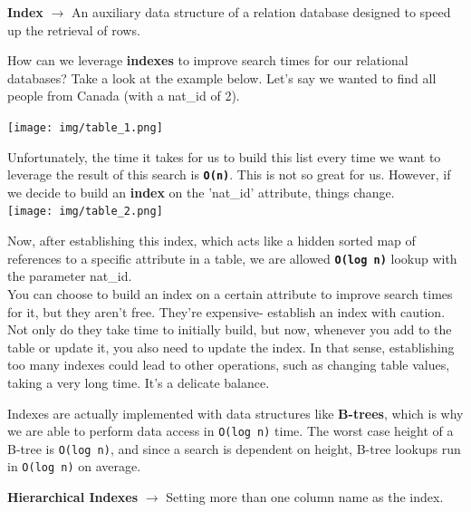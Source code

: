 \documentclass[english, 10pt]{article}
\begin{document}
\begin{tcolorbox}[title=Definition:,colframe=red!75!black,colback=red!5!white,arc=0pt,fonttitle=\bfseries]
\textbf{Index} $\rightarrow$ An auxiliary data structure of a relation database designed to speed up the retrieval of rows.
\end{tcolorbox}


\hfill \break How can we leverage \textbf{indexes} to improve search times for our relational databases? Take a look at the example below. Let's say we wanted to find all people from Canada (with a nat\_id of 2).\\

{
\centering

\texttt{[image: img/table\_1.png]} 

}

\hfill \break Unfortunately, the time it takes for us to build this list every time we want to leverage the result of this search is \texttt{\textbf{O(n)}}. This is not so great for us. However, if we decide to build an \textbf{index} on the 'nat\_id' attribute, things change. \\

{
\centering
\texttt{[image: img/table\_2.png]} 
}


\hfill \break Now, after establishing this index, which acts like a hidden sorted map of references to a specific attribute in a table, we are allowed \texttt{\textbf{O(log n)}} lookup with the parameter nat\_id.\\

You can choose to build an index on a certain attribute to improve search times for it, but they aren't free. They're expensive- establish an index with caution. Not only do they take time to initially build, but now, whenever you add to the table or update it, you also need to update the index. In that sense, establishing too many indexes could lead to other operations, such as changing table values, taking a very long time. It's a delicate balance.\\


\begin{tcolorbox}[title=Aside: Indexes,colframe=black,colback=white,arc=0pt,fonttitle=\bfseries]
Indexes are actually implemented with data structures like \textbf{B-trees}, which is why we are able to perform data access in \texttt{O(log n)} time. The worst case height of a B-tree is \texttt{O(log n)}, and since a search is dependent on height, B-tree lookups run in \texttt{O(log n)} on average.
\end{tcolorbox}
\begin{tcolorbox}[title=Definition:,colframe=red!75!black,colback=red!5!white,arc=0pt,fonttitle=\bfseries]
	\textbf{Hierarchical Indexes} $\rightarrow$ Setting more than one column name as the index. 
	\end{tcolorbox}
\end{document}
